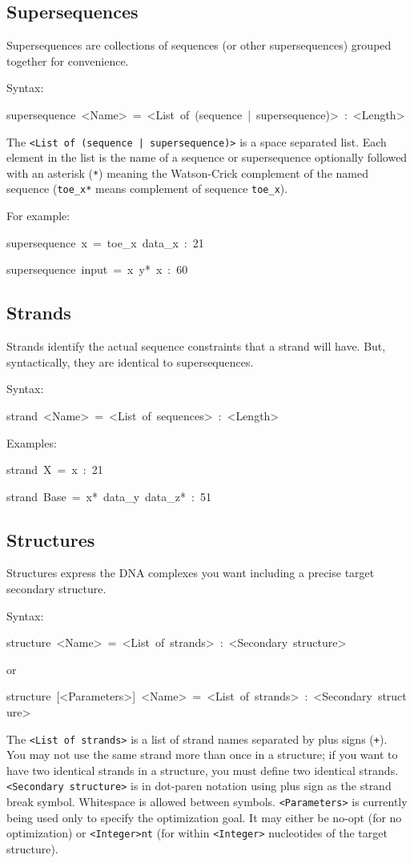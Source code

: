 \documentclass{article}
\newenvironment{code}
{\par\begin{list}{}{
\setlength{\rightmargin}{\leftmargin}
\setlength{\listparindent}{0pt}
\raggedright
\setlength{\itemsep}{0pt}
\setlength{\parsep}{0pt}
\normalfont\ttfamily}
 \item[]}
{\end{list}}
\begin{document}
\subsection{Supersequences}

Supersequences are collections of sequences (or other supersequences)
grouped together for convenience.

Syntax:
\begin{code}
supersequence~<Name>~=~<List~of~(sequence~|~supersequence)>~:~<Length>
\end{code}
The \texttt{<List~of~(sequence~|~supersequence)>} is a space separated list. Each element
in the list is the name of a sequence or supersequence optionally
followed with an asterisk (\texttt{*}) meaning the Watson-Crick complement
of the named sequence (\texttt{toe\_x*} means complement of sequence \texttt{toe\_x}).

For example:
\begin{code}
supersequence~x~=~toe\_x~data\_x~:~21

supersequence~input~=~x~y{*}~x~:~60
\end{code}

\subsection{Strands}

Strands identify the actual sequence constraints that a strand will
have. But, syntactically, they are identical to supersequences.

Syntax:
\begin{code}
strand~<Name>~=~<List~of~sequences>~:~<Length>
\end{code}
Examples:
\begin{code}
strand~X~=~x~:~21

strand~Base~=~x{*}~data\_y~data\_z{*}~:~51
\end{code}

\subsection{Structures}

Structures express the DNA complexes you want including a precise
target secondary structure.

Syntax:
\begin{code}
structure~<Name>~=~<List~of~strands>~:~<Secondary~structure>
\end{code}
or
\begin{code}
structure~{[}<Parameters>{]}~<Name>~=~<List~of~strands>~:~<Secondary~structure>
\end{code}
The \texttt{<List of strands>} is a list of strand names separated by plus
signs (\texttt{+}). You may not use the same strand more than once in a structure;
if you want to have two identical strands in a structure, you must
define two identical strands. \texttt{<Secondary structure>} is in dot-paren
notation using plus sign as the strand break symbol. Whitespace is
allowed between symbols. \texttt{<Parameters>} is currently being used only
to specify the optimization goal. It may either be no-opt (for no
optimization) or \texttt{<Integer>nt} (for within \texttt{<Integer>} nucleotides of the target structure).
\end{document}
